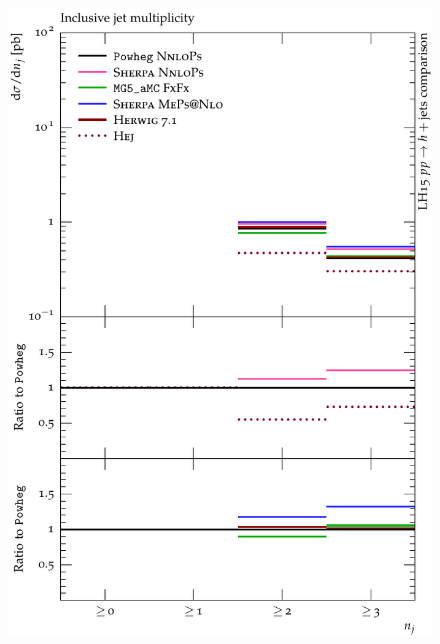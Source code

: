 \begin{figure}[t!]
  \centering
  \begin{minipage}{0.47\textwidth}
    \includegraphics[width=\textwidth]{figures/hjetscomp_u_NJet_incl_30_VBF2.pdf}
  \end{minipage}
  \hfill
  \begin{minipage}{0.47\textwidth}
    \lineskip-1.35pt

\end{minipage}
\end{figure}
